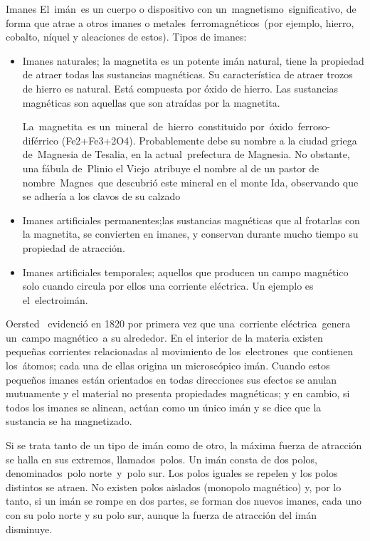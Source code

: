 \newpage %
\begin{myblock}{Imanes}
El imán es un cuerpo o dispositivo con un magnetismo significativo, de forma que atrae a otros imanes o metales ferromagnéticos (por ejemplo, hierro, cobalto, níquel y aleaciones de estos). 
\vspace{2mm} Tipos de imanes:
\begin{itemize}
\item Imanes naturales; la magnetita es un potente imán natural, tiene la propiedad de atraer todas las sustancias magnéticas. Su característica de atraer trozos de hierro es natural. Está compuesta por óxido de hierro. Las sustancias magnéticas son aquellas que son atraídas por la magnetita.

La magnetita es un mineral de hierro constituido por óxido ferroso-diférrico (Fe2+Fe3+2O4). Probablemente debe su nombre a la ciudad griega de Magnesia de Tesalia, en la actual prefectura de Magnesia. No obstante, una fábula de Plinio el Viejo atribuye el nombre al de un pastor de nombre Magnes que descubrió este mineral en el monte Ida, observando que se adhería a los clavos de su calzado

\item Imanes artificiales permanentes;las sustancias magnéticas que al frotarlas con la magnetita, se convierten en imanes, y conservan durante mucho tiempo su propiedad de atracción.
\item Imanes artificiales temporales; aquellos que producen un campo magnético solo cuando circula por ellos una corriente eléctrica. Un ejemplo es el electroimán.
\end{itemize}

\vspace{2mm} Oersted  evidenció en 1820 por primera vez que una corriente eléctrica genera un campo magnético a su alrededor. En el interior de la materia existen pequeñas corrientes relacionadas al movimiento de los electrones que contienen los átomos; cada una de ellas origina un microscópico imán. Cuando estos pequeños imanes están orientados en todas direcciones sus efectos se anulan mutuamente y el material no presenta propiedades magnéticas; y en cambio, si todos los imanes se alinean, actúan como un único imán y se dice que la sustancia se ha magnetizado.


\vspace{2mm} Si se trata tanto de un tipo de imán como de otro, la máxima fuerza de atracción se halla en sus extremos, llamados polos. Un imán consta de dos polos, denominados polo norte y polo sur. Los polos iguales se repelen y los polos distintos se atraen. No existen polos aislados (monopolo magnético) y, por lo tanto, si un imán se rompe en dos partes, se forman dos nuevos imanes, cada uno con su polo norte y su polo sur, aunque la fuerza de atracción del imán disminuye.


\end{myblock}
